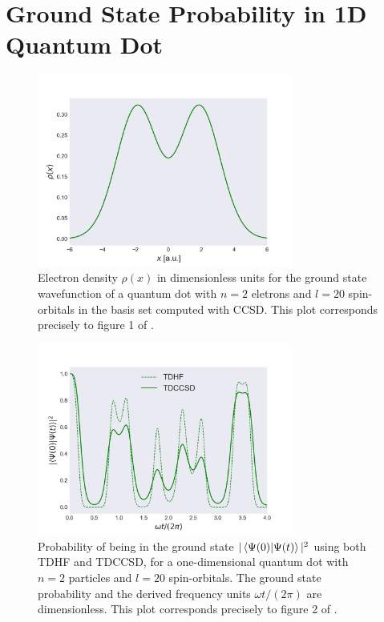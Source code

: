 \section{Ground State Probability in 1D Quantum Dot}

\begin{figure}
    \centering
    \includegraphics[width=0.75\textwidth]{results/figures/zanghellini_fig1.png}
    \caption{
        \label{fig:zanghellini_fig1}
        Electron density $\rho(x)$ in dimensionless units for the ground state wavefunction of
        a quantum dot with 
        $n=2$ eletrons and $l=20$ spin-orbitals in the basis set computed with
        CCSD. This plot 
        corresponds precisely to figure 1 of
        \citeauthor{Zanghellini04} \cite{Zanghellini04}.
    }
\end{figure}

\begin{figure}
    \centering
    \includegraphics[width=0.75\textwidth]{results/figures/zanghellini_fig2.png}
    \caption{
        \label{fig:zanghellini_fig2}
        Probability of being in the ground state $|\braket{\Psi(0)}{\Psi(t)}|^2$
        using both TDHF and TDCCSD, for a one-dimensional quantum dot with $n=2$
        particles and $l=20$ spin-orbitals. The ground state probability
        and the derived frequency units $\omega t/(2\pi)$ are dimensionless.
        This plot corresponds precisely to 
        figure 2 of \citeauthor{Zanghellini04} \cite{Zanghellini04}.
    }           
\end{figure}

